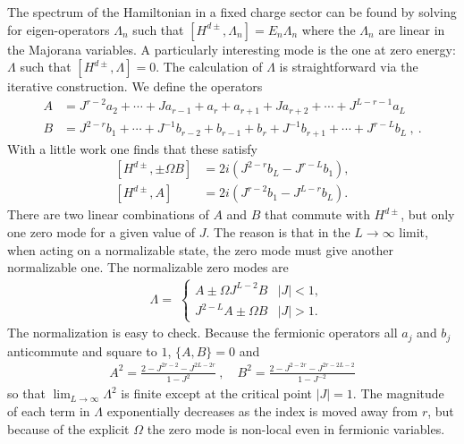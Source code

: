 \documentclass[11pt]{article}
\numberwithin{equation}{section}		%
\begin{document}
The spectrum of the Hamiltonian in a fixed charge sector can be found by solving for eigen-operators $\Lambda_n$ such that $[ H^{d\pm}, \Lambda_n] = E_n \Lambda_n$ where the $\Lambda_n$ are linear in the Majorana variables. A particularly interesting mode is the one at zero energy: $\Lambda$ such that $[H^{d\pm},\Lambda] = 0$. The calculation of $\Lambda$ is straightforward via the iterative construction. We define the operators
\begin{equation}
\begin{aligned}
A & =  {J^{r-2}}{a_2} + \cdots +  {J}{a_{r-1}}+ a_r + a_{r+1}  + J{a_{r+2}}+ \cdots   + {J^{L-r-1}}{a_L}\\
B &= J^{2-r} b_1 + \cdots + J^{-1} b_{r-2} +b_{r-1} + b_r + J^{-1} b_{r+1} + \cdots +J^{r-L} b_L\ , \ .
\end{aligned}
\end{equation}
With a little work one finds that these satisfy
\begin{equation}
\begin{aligned}
[H ^{d\pm}, \pm{\Omega} B] &= 2 i  ( J^{2-r} b_L -  J^{r-L} b_1),  \\
[H^{d\pm}, A ] & = 2i(J ^{r-2}b_1 - J^{L-r}b_L).
\end{aligned}
\end{equation}
There are two linear combinations of $A$ and $B$ that commute with $H^{d\pm}$, but only one zero mode for a given value of $J$. The reason is that in the $L\to\infty$ limit, when acting on a normalizable state, the zero mode must give another normalizable one. The normalizable zero modes are
\begin{align}
&\Lambda  =\;
	\begin{cases}		
		   A \pm  {\Omega}J^{L-2}B	&	|J|<1, \\
		 J^{2-L}A \pm {\Omega}B   	&	|J|>1. 
		\end{cases}
		\label{ZeroMode}
\end{align}
The normalization is easy to check. Because the fermionic operators all $a_j$ and $b_j$ anticommute and square to $1$, $\{A,B\}=0$ and
\begin{align}
A^2=\frac{2-J^{2r-2}-J^{2L-2r}}{1-J^2} \ ,\quad B^2=\frac{2-J^{2-2r}-J^{2r-2L-2}}{1-J^{-2}}
\end{align}
so that $\lim_{L\to\infty} \Lambda^2$ is finite except at the critical point $|J|=1$.
The magnitude of each term in $\Lambda$ exponentially decreases as the index is moved away from $r$, but because of the explicit $\Omega$ the zero mode is non-local even in fermionic variables. 
\end{document}
